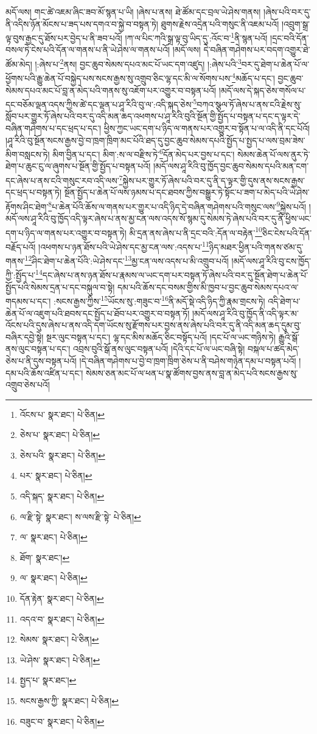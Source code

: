 མདོ་ལས། གང་ཚེ་འཇམ་ཞིང་ཟབ་མོ་སྙན་པ་ཡི། །ཞེས་པ་ནས། ཐེ་ཚོམ་དང་བྲལ་ཡེ་ཤེས་གནས། །ཞེས་པའི་བར་དུ་ནི་འདིས་ཉོན་མོངས་པ་ཟད་པས་དགའ་བ་སྐྱེ་བ་བསྟན་ཏེ། ཐུགས་རྗེས་འདྲེན་པའི་གསུང་ནི་འཇམ་པའོ། །འབྲུག་སྒྲ་ལྟ་བུས་རྒྱང་དུ་ཐོས་པར་བྱེད་པ་ནི་ཟབ་པའོ། །ཀ་ལ་པིང་ཀའི་སྒྲ་ལྟ་བུ་ཡིད་དུ་:འོང་བ་\footnote{འོངས་པ་  སྣར་ཐང་།  པེ་ཅིན། }ནི་སྙན་པའོ། །དྲང་བའི་དོན་བསལ་ཏེ་ངེས་པའི་དོན་ལ་གནས་པ་ནི་ཡེ་ཤེས་ལ་གནས་པའོ། །མདོ་ལས། དེ་བཞིན་གཤེགས་པར་བདག་འགྱུར་ཐེ་ཚོམ་མེད། །:ཞེས་པ་\footnote{ཅེས་པ་  སྣར་ཐང་།  པེ་ཅིན། }ནས། བྱང་ཆུབ་སེམས་དཔའ་མང་པོ་ཡང་དག་འཛུད། །:ཞེས་པའི་\footnote{ཅེས་པའི་  སྣར་ཐང་།  པེ་ཅིན། }བར་དུ་ཐེག་པ་ཆེན་པོ་ལ་ཕྱོགས་པའི་རྒྱུ་ཆེན་པོ་བསྐྱེད་པས་སངས་རྒྱས་སུ་འགྲུབ་ཅིང་ལྷ་དང་མི་ལ་སོགས་པས་\footnote{པར་  སྣར་ཐང་།  པེ་ཅིན། }མཆོད་པ་དང་། བྱང་ཆུབ་སེམས་དཔའ་མང་པོ་བླ་ན་མེད་པའི་གནས་སུ་འཇོག་པར་འགྱུར་བ་བསྟན་པའོ། །མདོ་ལས་དེ་སྐད་ཅེས་གསོལ་པ་དང་བཅོམ་ལྡན་འདས་ཀྱིས་ཚེ་དང་ལྡན་པ་ཤཱ་རིའི་བུ་ལ་:འདི་སྐད་ཅེས་\footnote{འདི་སྐད་  སྣར་ཐང་།  པེ་ཅིན། }བཀའ་སྩལ་ཏོ་ཞེས་པ་ནས་ངའི་རྗེས་སུ་སློབ་པར་གྱུར་ཏོ་ཞེས་པའི་བར་དུ་འདི་མན་ཆད་འཕགས་པ་ཤཱ་རིའི་བུའི་སྔོན་གྱི་སྤྱོད་པ་བསྟན་པ་དང་ད་ལྟར་དེ་བཞིན་གཤེགས་པ་དང་ཕྲད་པ་དང་། ཕྱིས་ཀྱང་ཡང་དག་པ་ཉིད་ལ་གནས་པར་འགྱུར་བ་སྟོན་པ་ལ་འདི་ནི་དང་པོའོ། །ཤཱ་རིའི་བུ་སྔོན་སངས་རྒྱས་བྱེ་བ་ཁྲག་ཁྲིག་མང་པོའི་ཐད་དུ་བྱང་ཆུབ་སེམས་དཔའི་སྤྱོད་པ་སྤྱད་པ་ལས་བྲམ་ཟེས་མིག་བསླངས་ཏེ། མིག་བྱིན་པ་དང་། མིག་:ས་ལ་བརྫིས་ཏེ་\footnote{ལ་རྫི་སྟེ་  སྣར་ཐང་། ས་ལས་རྫི་སྟེ་  པེ་ཅིན། }དོན་མེད་པར་བྱས་པ་དང་། སེམས་ཆེན་པོ་ལས་ནུར་ཏེ་ཐེག་པ་ཆུང་ངུ་ལ་ཞུགས་པ་སྔོན་གྱི་སྤྱོད་པ་བསྟན་པའོ། །མདོ་ལས་ཤཱ་རིའི་བུ་ཁྱོད་བྱང་ཆུབ་སེམས་དཔའི་མན་ངག་དང་ཞེས་པ་ནས་ངའི་གསུང་རབ་འདི་ལས་\footnote{ལ་  སྣར་ཐང་།  པེ་ཅིན། }སྐྱེས་པར་གྱུར་ཏོ་ཞེས་པའི་བར་དུ་ནི་ད་ལྟར་གྱི་དུས་ནས་སངས་རྒྱས་དང་ཕྲད་པ་བསྟན་ཏེ། སྔོན་སྤྱོད་པ་ཆེན་པོ་ལས་ཉམས་པ་དང་ཐབས་ཀྱིས་བསྒྱུར་ཏེ་སྟོང་པ་ཟག་པ་མེད་པའི་ཡེ་ཤེས་རྟོགས་ཤིང་ཐེག་\footnote{ཐོག་  སྣར་ཐང་། }པ་ཆེན་པོའི་ཆོས་ལ་གནས་པར་གྱུར་པ་འདི་ཉིད་དེ་བཞིན་གཤེགས་པའི་གསུང་ལས་\footnote{ལ་  སྣར་ཐང་།  པེ་ཅིན། }སྐྱེས་པའོ། །མདོ་ལས་ཤཱ་རིའི་བུ་ཁྱོད་འདི་ལྟར་ཞེས་པ་ནས་མྱ་ངན་ལས་འདས་སོ་སྙམ་དུ་སེམས་ཏེ་ཞེས་པའི་བར་དུ་ནི་ཕྱིས་ཡང་དག་པ་ཉིད་ལ་གནས་པར་འགྱུར་བ་བསྟན་ཏེ། མི་དྲན་ནས་ཞེས་པ་ནི་དྲང་བའི་:དོན་ལ་བརྟེན་\footnote{དོན་རྟེན་  སྣར་ཐང་།  པེ་ཅིན། }ཅིང་ངེས་པའི་དོན་བརྗོད་པའོ། །འཕགས་པ་ཉན་ཐོས་པའི་ཡེ་ཤེས་དང་མྱ་ངན་ལས་:འདས་པ་\footnote{འདའ་བ་  སྣར་ཐང་།  པེ་ཅིན། }ཉིད་མཐར་ཕྱིན་པའི་གནས་ཙམ་དུ་གནས་\footnote{སེམས་  སྣར་ཐང་།  པེ་ཅིན། }ཤིང་ཐེག་པ་ཆེན་པོའི་:ཡེ་ཤེས་དང་\footnote{ཡེ་ཤེས་  སྣར་ཐང་།  པེ་ཅིན། }མྱ་ངན་ལས་འདས་པ་མི་འགྲུབ་པའོ། །མདོ་ལས་ཤཱ་རིའི་བུ་ངས་ཁྱོད་ཀྱི་:སྤྱོད་པ་\footnote{སྤྱད་པ་  སྣར་ཐང་། }དང་ཞེས་པ་ནས་ཉན་ཐོས་པ་རྣམས་ལ་ཡང་དག་པར་བསྟན་ཏོ་ཞེས་པའི་བར་དུ་སྔོན་ཐེག་པ་ཆེན་པོ་སྤྱོད་པའི་སེམས་དྲན་པ་དང་བསྐུལ་བ་སྟེ། དམ་པའི་ཆོས་དང་བསམ་གྱིས་མི་ཁྱབ་པ་བྱང་ཆུབ་སེམས་དཔའ་ལ་གདམས་པ་དང་། :སངས་རྒྱས་ཀྱིས་\footnote{སངས་རྒྱས་ཀྱི་  སྣར་ཐང་།  པེ་ཅིན། }ཡོངས་སུ་:གཟུང་བ་\footnote{བཟུང་བ་  སྣར་ཐང་།  པེ་ཅིན། }ནི་མདོ་སྡེ་འདི་ཉིད་ཀྱི་རྣམ་གྲངས་ཏེ། འདི་ཐེག་པ་ཆེན་པོ་ལ་འཇུག་པའི་ཐབས་དང་སྤྱོད་པ་ཐོབ་པར་འགྱུར་བ་བསྟན་ཏོ། །མདོ་ལས་ཤཱ་རིའི་བུ་ཁྱོད་ནི་འདི་ལྟར་མ་འོངས་པའི་དུས་ཞེས་པ་ནས་འདི་དག་ཡོངས་སུ་རྫོགས་པར་བྱས་ནས་ཞེས་པའི་བར་དུ་ནི་འདི་མན་ཆད་དུམ་བུ་བཞིར་དབྱེ་སྟེ། སྔར་ལུང་བསྟན་པ་དང་། ལྷ་དང་མིས་མཆོད་ཅིང་བསྟོད་པའོ། །དང་པོ་ལ་ཡང་གཉིས་ཏེ། རྒྱུའི་སྒོ་ནས་ལུང་བསྟན་པ་དང་། འབྲས་བུའི་སྒོ་ནས་ལུང་བསྟན་པའོ། །དེའི་དང་པོ་ལ་ཡང་བཞི་སྟེ། བསྐལ་པ་ཚད་མེད་ཅེས་པ་ནི་དུས་བསྟན་པའོ། །དེ་བཞིན་གཤེགས་པ་བྱེ་བ་ཁྲག་ཁྲིག་ཅེས་པ་ནི་བཤེས་གཉེན་དམ་པ་བསྟན་པའོ། །དམ་པའི་ཆོས་འཛིན་པ་དང་། སེམས་ཅན་མང་པོ་ལ་ཕན་པ་སྣ་ཚོགས་བྱས་ནས་བླ་ན་མེད་པའི་སངས་རྒྱས་སུ་འགྲུབ་ཅེས་པའོ། 